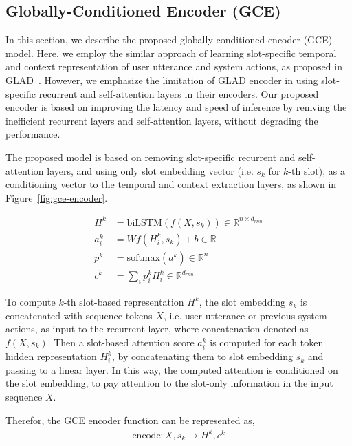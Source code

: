 \documentclass{article}
\begin{document}
\subsection{Globally-Conditioned Encoder (GCE)}
\label{seq:proposed}
In this section, we describe the proposed globally-conditioned encoder (GCE) model. Here, we employ the similar approach of learning slot-specific temporal and context representation of user utterance and system actions, as proposed in GLAD~\citep{Zhong2018GlobalLocallySD}. However, we emphasize the limitation of GLAD encoder in using slot-specific recurrent and self-attention layers in their encoders. Our proposed encoder is based on improving the latency and speed of inference by remving the inefficient recurrent layers and self-attention layers, without degrading the performance. 

The proposed model is based on removing slot-specific recurrent and self-attention layers, and using only slot embedding vector (i.e. $s_{k}$ for $k$-th slot), as a conditioning vector to the temporal and context extraction layers, as shown in Figure~\ref{fig:gce-encoder}.   

\begin{align}
    H^{k} & =  \text{biLSTM}(f(X,s_{k}))\in \mathbb{R}^{n\times d_{rnn}} \\
    a_{i}^{k} & =  W f(H^{k}_{i}, s_{k}) + b \in \mathbb{R} \\
    p^{k} & =  \text{softmax}(a^{k}) \in \mathbb{R}^{n} \\
    c^{k} & =  \sum_{i}{p^{k}_{i} H^{k}_{i}} \in \mathbb{R}^{d_{rnn}}
\end{align}


To compute $k$-th slot-based representation $H^{k}$, the slot embedding $s_{k}$ is concatenated with sequence tokens $X$, i.e. user utterance or previous system actions, as input to the recurrent layer, where concatenation denoted as $f(X, s_{k})$. 
Then a slot-based attention score $a^{k}_{i}$ is computed for each token hidden representation $H^{k}_{i}$, by concatenating them to slot embedding $s_{k}$ and passing to a linear layer. In this way, the computed attention is conditioned on the slot embedding, to pay attention to the slot-only information in the input sequence $X$.

Therefor, the GCE encoder function can be represented as,
\begin{align}
    \text{encode} : X, s_{k} \rightarrow H^{k}, c^{k} 
\end{align}
\end{document}
